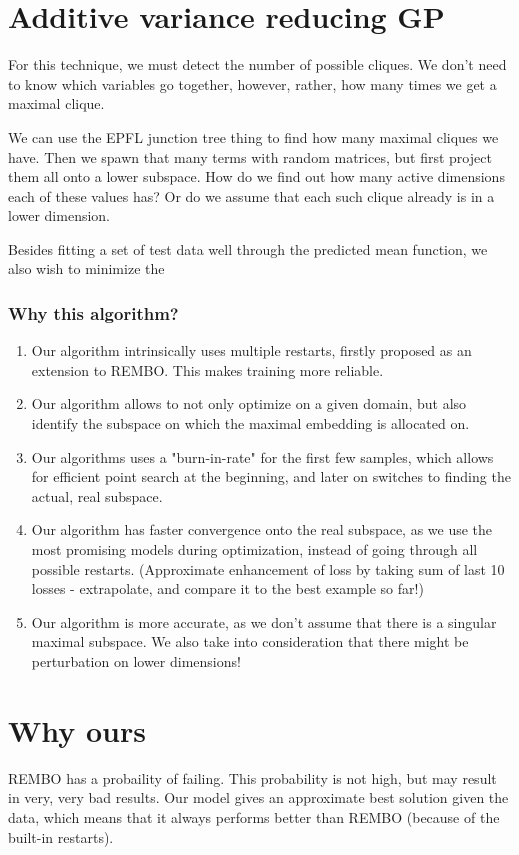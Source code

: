 \section{Additive variance reducing GP}
For this technique, we must detect the number of possible cliques.
We don't need to know which variables go together, however, rather, how many times we get a maximal clique.

We can use the EPFL junction tree thing to find how many maximal cliques we have. 
Then we spawn that many terms with random matrices, but first project them all onto a lower subspace.
How do we find out how many active dimensions each of these values has?
Or do we assume that each such clique already is in a lower dimension.


Besides fitting a set of test data well through the predicted mean function, we also wish to minimize the 

\subsubsection{Why this algorithm?}

\begin{enumerate}
\item Our algorithm intrinsically uses multiple restarts, firstly proposed as an extension to REMBO.
This makes training more reliable.
\item Our algorithm allows to not only optimize on a given domain, but also identify the subspace on which the maximal embedding is allocated on.
\item Our algorithms uses a "burn-in-rate" for the first few samples, which allows for efficient point search at the beginning, and later on switches to finding the actual, real subspace.
\item Our algorithm has faster convergence onto the real subspace, as we use the most promising models during optimization, instead of going through all possible restarts. (Approximate enhancement of loss by taking sum of last 10 losses - extrapolate, and compare it to the best example so far!)
\item Our algorithm is more accurate, as we don't assume that there is a singular maximal subspace. 
We also take into consideration that there might be perturbation on lower dimensions!
\end{enumerate}







\section{Why ours}
REMBO has a probaility of failing. This probability is not high, but may result in very, very bad results. 
Our model gives an approximate best solution given the data, which means that it always performs better than REMBO (because of the built-in restarts).


